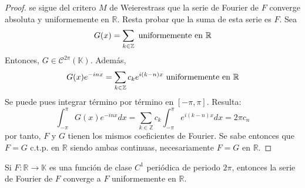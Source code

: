 \documentclass[12pt]{report}
\newcounter{it}
\theoremstyle{largebreak}
\newcommand\cf[3]{\ensuremath{#1:#2\rightarrow#3}}
\begin{document}
\begin{proof}
        se sigue del critero $M$ de Weierestrass que la serie de Fourier de $F$ converge absoluta y uniformemente en $\mathbb{R}$. Resta probar que la suma de esta serie es $F$. Sea
        \begin{equation*}
            G(x)=\sum_{ k\in\mathbb{Z}}\textup{ uniformemente en }\mathbb{R}
        \end{equation*}
        Entonces, $G\in\mathcal{C}^{2\pi}(\mathbb{K})$. Además,
        \begin{equation*}
            G(x)e^{ -inx}=\sum_{ k\in\mathbb{Z}}c_ke^{ i(k-n)x}\textup{ uniformemente en }\mathbb{R}
        \end{equation*}
        Se puede pues integrar término por término en $[-\pi,\pi]$. Resulta:
        \begin{equation*}
            \int_{ -\pi}^\pi G(x)e^{ -inx}dx=\sum_{ k\in\mathbb{Z}}c_k\int_{ -\pi}^\pi e^{ i(k-n)x}dx=2\pi c_n
        \end{equation*}
        por tanto, $F$ y $G$ tienen los mismos coeficientes de Fourier. Se sabe entonces que $F=G$ c.t.p. en $\mathbb{R}$ siendo ambas continuas, necesariamente $F=G$ en $\mathbb{R}$.
    \end{proof}

    \begin{cor}
        Si $\cf{F}{\mathbb{R}}{\mathbb{K}}$ es una función de clase $C^1$ periódica de periodo $2\pi$, entonces la serie de Fourier de $F$ converge a $F$ uniformemente en $\mathbb{R}$.
    \end{cor}
\end{document}
